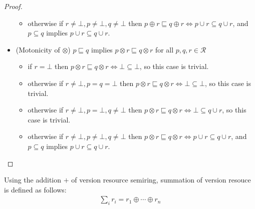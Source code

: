\begin{proof}
\begin{itemize}
\begin{itemize}
        \item otherwise if $r \neq \bot, p \neq \bot, q \neq \bot$ then $p\oplus r \sqsubseteq q \oplus r \Leftrightarrow p \cup r \subseteq q\cup r$, and  $p \subseteq q$ implies $p \cup r \subseteq q\cup r$.
    \end{itemize}
\item (Motonicity of $\otimes$) $p\sqsubseteq q$ implies $p\otimes r\sqsubseteq q\otimes r$ for all $p, q, r \in \mathcal{R}$
    \begin{itemize}
        \item if $r = \bot$ then $p\otimes r \sqsubseteq q\otimes r \Leftrightarrow \bot\subseteq \bot$, so this case is trivial.
        \item otherwise if $r \neq \bot, p = q = \bot$ then $p\otimes r \sqsubseteq q \otimes r \Leftrightarrow \bot\subseteq \bot$, so this case is trivial.
        \item otherwise if $r \neq \bot, p = \bot, q\neq \bot$ then $p\otimes r \sqsubseteq q \otimes r \Leftrightarrow \bot\subseteq q\cup r$, so this case is trivial.
        \item otherwise if $r \neq \bot, p \neq \bot, q \neq \bot$ then $p\otimes r \sqsubseteq q \otimes r \Leftrightarrow p \cup r \subseteq q\cup r$, and  $p \subseteq q$ implies $p \cup r \subseteq q\cup r$.
    \end{itemize}
\end{itemize}
\end{proof}

\begin{definition}
Using the addition $+$ of version resource semiring, summation of version resouce is defined as follows:
\begin{align*}
\sum_i r_i = r_1 \oplus \cdots \oplus r_n
\end{align*}
\end{definition}



